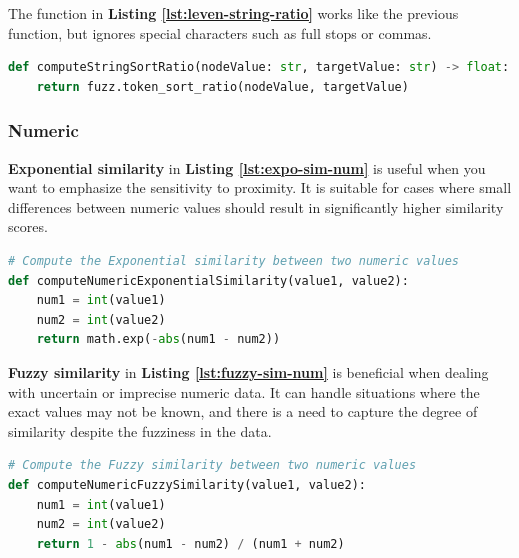    
    The function in \textbf{Listing \ref{lst:leven-string-ratio}} works like the previous function, but ignores special characters such as full stops or commas.\\
    
\begin{lstlisting}[language=Python, caption=Levenstein Distance Between Two Strings Without Considering Special Characters, label={lst:leven-string-ratio}]
def computeStringSortRatio(nodeValue: str, targetValue: str) -> float:
    return fuzz.token_sort_ratio(nodeValue, targetValue)
\end{lstlisting}





    \subsubsection{Numeric}
    
    \textbf{Exponential similarity} in \textbf{Listing \ref{lst:expo-sim-num}} is useful when you want to emphasize the sensitivity to proximity. It is suitable for cases where small differences between numeric values should result in significantly higher similarity scores.\\
    
\begin{lstlisting}[language=Python, caption=Function to Compute the Similarity Value Between Two Numerics using the Exponential Function, label={lst:expo-sim-num}]
# Compute the Exponential similarity between two numeric values
def computeNumericExponentialSimilarity(value1, value2):
    num1 = int(value1)
    num2 = int(value2)
    return math.exp(-abs(num1 - num2))
\end{lstlisting}
    
    
    \textbf{Fuzzy similarity} in \textbf{Listing \ref{lst:fuzzy-sim-num}} is beneficial when dealing with uncertain or imprecise numeric data. It can handle situations where the exact values may not be known, and there is a need to capture the degree of similarity despite the fuzziness in the data.\\
    
\begin{lstlisting}[language=Python, caption=Function to Compute the Similarity Value Between Two Numerics using the Fuzzy Computation, label={lst:fuzzy-sim-num}]
# Compute the Fuzzy similarity between two numeric values
def computeNumericFuzzySimilarity(value1, value2):
    num1 = int(value1)
    num2 = int(value2)
    return 1 - abs(num1 - num2) / (num1 + num2)
\end{lstlisting}

